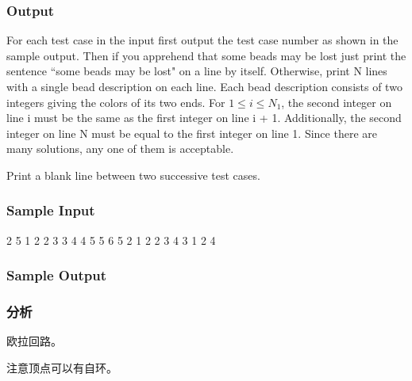 \subsubsection{Output}
For each test case in the input first output the test case number as shown in the sample output. Then 
if you apprehend that some beads may be lost just print the sentence ``some beads may be lost" on a 
line by itself. Otherwise, print N lines with a single bead description on each line. Each bead 
description consists of two integers giving the colors of its two ends. For $1 \leq i \leq N_1$, the second integer 
on line i must be the same as the first integer on line i + 1. Additionally, the second integer 
on line N must be equal to the first integer on line 1. Since there are many solutions, any one
 of them is acceptable.
 
Print a blank line between two successive test cases.
 
\subsubsection{Sample Input}
\begin{Code}
2
5
1 2
2 3
3 4
4 5
5 6
5
2 1
2 2
3 4
3 1
2 4
\end{Code}
 
\subsubsection{Sample Output}
 
\subsubsection{分析}
欧拉回路。
 
注意顶点可以有自环。


